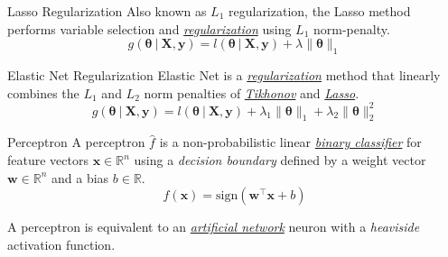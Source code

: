 \documentclass{cognito}
\begin{document}
\begin{note}{Lasso Regularization}
	Also known as $L_1$ regularization, the Lasso method performs variable selection and \hyperref[note:Regularization]{\it regularization}
	using $L_1$ norm-penalty.
	$$
		 g(\bm \theta \:\vert\: \bm X, \bm y) = l(\bm \theta \:\vert\: \bm X, \bm y ) + \lambda \| \bm \theta \|_1
	$$
	\vspace{-10pt}
\end{note}

\begin{note}{Elastic Net Regularization}
	Elastic Net is a \hyperref[note:Regularization]{\it regularization} method that linearly
	combines the $L_1$ and $L_2$ norm penalties of \hyperref[note:Tikhonov Regularization]{\it Tikhonov} and 
	\hyperref[note:Lasso Regularization]{\it Lasso}.
	$$
		 g(\bm \theta \:\vert\: \bm X, \bm y) = l(\bm \theta \:\vert\: \bm X, \bm y ) + \lambda_1 \| \bm \theta \|_1 + \lambda_2 \| \bm \theta \|_2^2
	$$
	\vspace{-10pt}
\end{note}

\begin{note}{Perceptron}
	A perceptron $\hat f$ is a non-probabilistic linear \hyperref[note:Supervised Learning]{\it binary classifier} for feature vectors $\bm x \in \mathbb{R}^n$
	using a \emph{decision boundary} defined by a weight vector $\bm w \in \mathbb{R}^n$ and a bias $b \in \mathbb{R}$. 
	$$ \hat f(\bm x) = \text{sign}(\bm w^\intercal \bm x + b) $$
	\begin{remark}
		A perceptron is equivalent to an \hyperref[note:Artificial Neural Network]{\it artificial network} neuron with a \emph{heaviside} activation function.
	\end{remark}
	\vspace{-5pt}
\end{note}
\end{document}
